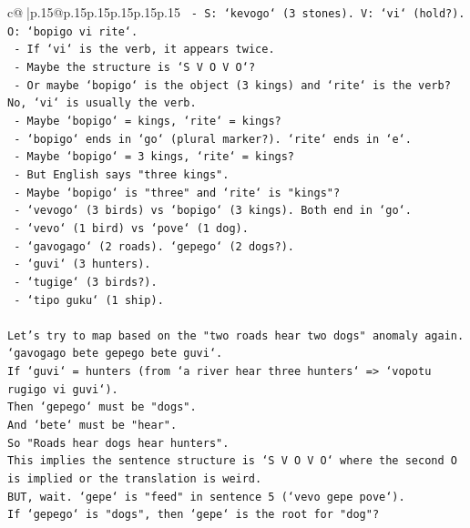 \documentclass{article}
\begin{document}
{\begin{supertabular}{c@{$\;$}|p{.15\linewidth}@{}p{.15\linewidth}p{.15\linewidth}p{.15\linewidth}p{.15\linewidth}p{.15\linewidth}}
{{{\texttt{       {-} S: `kevogo` (3 stones). V: `vi` (hold?). O: `bopigo vi rite`.} \\
\texttt{       {-} If `vi` is the verb, it appears twice.} \\
\texttt{       {-} Maybe the structure is `S V O V O`?} \\
\texttt{       {-} Or maybe `bopigo` is the object (3 kings) and `rite` is the verb? No, `vi` is usually the verb.} \\
\texttt{       {-} Maybe `bopigo` = kings, `rite` = kings?} \\
\texttt{       {-} `bopigo` ends in `go` (plural marker?). `rite` ends in `e`.} \\
\texttt{       {-} Maybe `bopigo` = 3 kings, `rite` = kings?} \\
\texttt{       {-} But English says "three kings".} \\
\texttt{       {-} Maybe `bopigo` is "three" and `rite` is "kings"?} \\
\texttt{       {-} `vevogo` (3 birds) vs `bopigo` (3 kings). Both end in `go`.} \\
\texttt{       {-} `vevo` (1 bird) vs `pove` (1 dog).} \\
\texttt{       {-} `gavogago` (2 roads). `gepego` (2 dogs?).} \\
\texttt{       {-} `guvi` (3 hunters).} \\
\texttt{       {-} `tugige` (3 birds?).} \\
\texttt{       {-} `tipo guku` (1 ship).} \\
\\ 
\texttt{Let's try to map based on the "two roads hear two dogs" anomaly again.} \\
\texttt{`gavogago bete gepego bete guvi`.} \\
\texttt{If `guvi` = hunters (from `a river hear three hunters` => `vopotu rugigo vi guvi`).} \\
\texttt{Then `gepego` must be "dogs".} \\
\texttt{And `bete` must be "hear".} \\
\texttt{So "Roads hear dogs hear hunters".} \\
\texttt{This implies the sentence structure is `S V O V O` where the second O is implied or the translation is weird.} \\
\texttt{BUT, wait. `gepe` is "feed" in sentence 5 (`vevo gepe pove`).} \\
\texttt{If `gepego` is "dogs", then `gepe` is the root for "dog"?} \\
}}}
\end{supertabular}}
\end{document}
